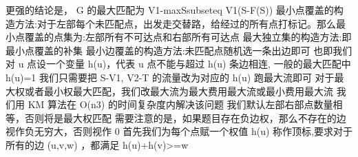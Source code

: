 {}更强的结论是，\markdownRendererDollarSign{} G \markdownRendererDollarSign{}的最大匹配为\markdownRendererDollarSign{} \markdownRendererPipe{}V1\markdownRendererPipe{}-max\markdownRendererUnderscore{}\markdownRendererLeftBrace{}S\markdownRendererBackslash{}subseteq V1\markdownRendererRightBrace{}(\markdownRendererPipe{}S\markdownRendererPipe{}-\markdownRendererPipe{}F(S)\markdownRendererPipe{}) \markdownRendererDollarSign{}\markdownRendererParagraphSeparator
{}最小点覆盖的构造方法:对于左部每个未匹配点，出发走交替路，给经过的所有点打标记。那么最小点覆盖的点集为:左部所有不可达点和右部所有可达点\markdownRendererParagraphSeparator
{}最大独立集的构造方法:即最小点覆盖的补集\markdownRendererParagraphSeparator
{}最小边覆盖的构造方法:未匹配点随机选一条出边即可\markdownRendererInterblockSeparator
{}
\markdownRendererSectionEnd \markdownRendererSectionBegin
{}\markdownRendererInterblockSeparator
{}也即我们对 \markdownRendererDollarSign{}u\markdownRendererDollarSign{} 点设一个变量 \markdownRendererDollarSign{}h(u)\markdownRendererDollarSign{}，代表 \markdownRendererDollarSign{}u\markdownRendererDollarSign{} 点不能与超过 \markdownRendererDollarSign{}h(u)\markdownRendererDollarSign{} 条边相连, 一般的最大匹配中 \markdownRendererDollarSign{}h(u)=1\markdownRendererDollarSign{}\markdownRendererParagraphSeparator
{}我们只需要把 \markdownRendererDollarSign{}S-V1, V2-T\markdownRendererDollarSign{} 的流量改为对应的 \markdownRendererDollarSign{}h(u)\markdownRendererDollarSign{} 跑最大流即可\markdownRendererInterblockSeparator
{}
\markdownRendererSectionEnd \markdownRendererSectionBegin
{}\markdownRendererInterblockSeparator
{}对于最大权或者最小权最大匹配，我们改最大流为最大费用最大流或最小费用最大流\markdownRendererInterblockSeparator
{}
\markdownRendererSectionEnd \markdownRendererSectionBegin
{}\markdownRendererInterblockSeparator
{}我们用\markdownRendererDollarSign{} KM \markdownRendererDollarSign{}算法在\markdownRendererDollarSign{} O(n\markdownRendererCircumflex{}3) \markdownRendererDollarSign{}的时间复杂度内解决该问题\markdownRendererParagraphSeparator
{}我们默认左部右部点数量相等，否则将是最大权匹配\markdownRendererParagraphSeparator
{}需要注意的是，如果题目存在负边权，那么不存在的边视作负无穷大，否则视作\markdownRendererDollarSign{} 0 \markdownRendererDollarSign{}\markdownRendererParagraphSeparator
{}首先我们为每个点赋一个权值\markdownRendererDollarSign{} h(u) \markdownRendererDollarSign{}称作顶标,要求对于所有的边\markdownRendererDollarSign{} (u,v,w) \markdownRendererDollarSign{}，都满足\markdownRendererDollarSign{} h(u)+h(v)>=w \markdownRendererDollarSign{}\markdownRendererParagraphSeparator
